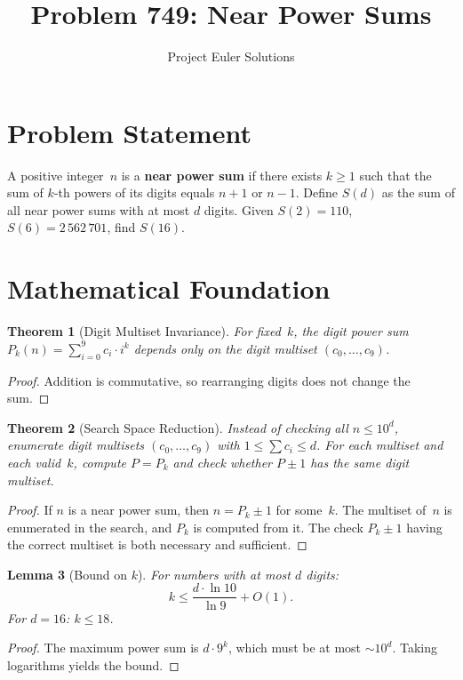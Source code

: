 \documentclass[11pt]{article}
\title{Problem 749: Near Power Sums}
\author{Project Euler Solutions}
\date{}
\newtheorem{theorem}{Theorem}
\newtheorem{lemma}[theorem]{Lemma}
\theoremstyle{definition}
\begin{document}
\maketitle

\section{Problem Statement}

A positive integer~$n$ is a \textbf{near power sum} if there exists $k \ge 1$ such that the sum of $k$-th powers of its digits equals $n+1$ or $n-1$. Define $S(d)$ as the sum of all near power sums with at most $d$ digits. Given $S(2)=110$, $S(6)=2\,562\,701$, find $S(16)$.

\section{Mathematical Foundation}

\begin{theorem}[Digit Multiset Invariance]
For fixed~$k$, the digit power sum $P_k(n) = \sum_{i=0}^{9} c_i \cdot i^k$ depends only on the digit multiset $(c_0,\ldots,c_9)$.
\end{theorem}

\begin{proof}
Addition is commutative, so rearranging digits does not change the sum.
\end{proof}

\begin{theorem}[Search Space Reduction]
Instead of checking all $n \le 10^d$, enumerate digit multisets $(c_0,\ldots,c_9)$ with $1 \le \sum c_i \le d$. For each multiset and each valid~$k$, compute $P = P_k$ and check whether $P \pm 1$ has the same digit multiset.
\end{theorem}

\begin{proof}
If $n$ is a near power sum, then $n = P_k \pm 1$ for some~$k$. The multiset of~$n$ is enumerated in the search, and $P_k$ is computed from it. The check $P_k \pm 1$ having the correct multiset is both necessary and sufficient.
\end{proof}

\begin{lemma}[Bound on $k$]
For numbers with at most $d$ digits:
\[
k \le \frac{d \cdot \ln 10}{\ln 9} + O(1).
\]
For $d = 16$: $k \le 18$.
\end{lemma}

\begin{proof}
The maximum power sum is $d \cdot 9^k$, which must be at most $\sim 10^d$. Taking logarithms yields the bound.
\end{proof}
\end{document}

